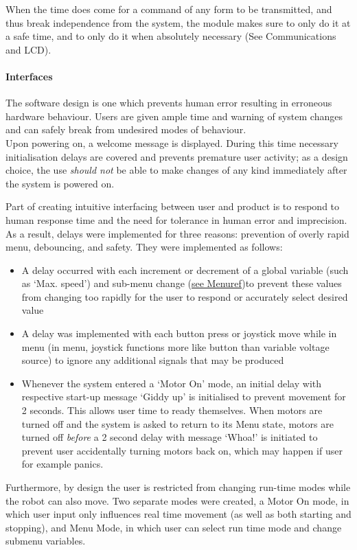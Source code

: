 	When the time does come for a command of any form to be transmitted, and thus break independence from the system, the module makes sure to only do it at a safe time, and to only do it when absolutely necessary (See Communications and LCD).

	\paragraph{Interfaces}
	
	The software design is one which prevents human error resulting in erroneous hardware behaviour. Users are given ample time and warning of system changes and can safely break from undesired modes of behaviour.\\
	
	Upon powering on, a welcome message is displayed. During this time necessary initialisation delays are covered and prevents premature user activity; as a design choice, the use \textit{should not} be able to make changes of any kind immediately after the system is powered on.
	
	Part of creating intuitive interfacing between user and product is to respond to human response time and the need for tolerance in human error and imprecision. As a result, delays were implemented for three reasons: prevention of overly rapid menu, debouncing, and safety. They were implemented as follows:
	\begin{itemize}
		\item A delay occurred with each increment or decrement of a global variable (such as `Max. speed') and sub-menu change (\underline{see Menu\textunderscore ref})to prevent these values from changing too rapidly for the user to respond or accurately select desired value
		\item A delay was implemented with each button press or joystick move while in menu (in menu, joystick functions more like button than variable voltage source) to ignore any additional signals that may be produced
		\item Whenever the system entered a `Motor On' mode, an initial delay with respective start-up message `Giddy up' is initialised to prevent movement for 2 seconds. This allows user time to ready themselves. When motors are turned off and the system is asked to return to its Menu state, motors are turned off \textit{before} a 2 second delay with message `Whoa!' is initiated to prevent user accidentally turning motors back on, which may happen if user for example panics. 
	\end{itemize}
	Furthermore, by design the user is restricted from changing run-time modes while the robot can also move. Two separate modes were created, a Motor On mode, in which user input only influences real time movement (as well as both starting and stopping), and Menu Mode, in which user can select run time mode and change submenu variables.
	

